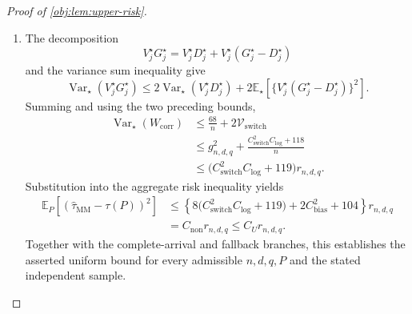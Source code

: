 \begin{proof}[Proof of \cref{obj:lem:upper-risk}]
\begin{enumerate}
To convert the first term into the benchmark, define
\[
\Lambda_n=\frac{e^{\ell_n/8}\ell_n^3}{n}.
\]
Since \(\delta^2\le\delta\), \(\ell_n\le\ell_n^2\), and \(B=256\ell_n\),
\[
4\delta^2B^2+2\delta B
\le262656\,\delta\ell_n^2.
\]
Substitution of \(m=n/8\) gives the calibrated bound
\[
12d\,e^{\ell_n/8}
\frac{4\delta^2B^2+2\delta B}{m^2}
\le
C_{\mathrm{switch}}g_{n,d,q}\Lambda_n,
\qquad
C_{\mathrm{switch}}=12\cdot64\cdot262656.
\]
The sixth term of the exponential series yields
\[
\frac{(3\ell_n/4)^6}{720}\le e^{3\ell_n/4},
\qquad
\ell_n^6\le720(4/3)^6e^{3\ell_n/4}.
\]
Since \(e^{\ell_n}=e+n\le(e+1)n\),
\[
\Lambda_n^2
=\frac{e^{\ell_n/4}\ell_n^6}{n^2}
\le\frac{720(4/3)^6e^{\ell_n}}{n^2}
\le\frac{C_{\mathrm{log}}}{n}.
\]
Finally, the nonnegative square
\((g_{n,d,q}-C_{\mathrm{switch}}\Lambda_n)^2\) gives
\[
C_{\mathrm{switch}}g_{n,d,q}\Lambda_n
\le\frac{g_{n,d,q}^2}{2}
+\frac{C_{\mathrm{switch}}^2\Lambda_n^2}{2}
\le\frac{g_{n,d,q}^2}{2}
+\frac{C_{\mathrm{switch}}^2C_{\mathrm{log}}}{2n}.
\]
Consequently,
\[
\mathcal V_{\mathrm{switch}}
\le
\frac{g_{n,d,q}^2}{2}
+\frac{C_{\mathrm{switch}}^2C_{\mathrm{log}}/2+25}{n}.
\]

\item The decomposition
\[
V_j^\star G_j^\star
=V_j^\star D_j^\star
+V_j^\star(G_j^\star-D_j^\star)
\]
and the variance sum inequality give
\[
\operatorname{Var}_\star(V_j^\star G_j^\star)
\le
2\operatorname{Var}_\star(V_j^\star D_j^\star)
+2\mathbb E_\star[
\{V_j^\star(G_j^\star-D_j^\star)\}^2].
\]
Summing and using the two preceding bounds,
\[
\begin{aligned}
\operatorname{Var}_\star(W_{\mathrm{corr}})
&\le\frac{68}{n}+2\mathcal V_{\mathrm{switch}}\\
&\le
g_{n,d,q}^2+
\frac{C_{\mathrm{switch}}^2C_{\mathrm{log}}+118}{n}\\
&\le
\bigl(C_{\mathrm{switch}}^2C_{\mathrm{log}}+119\bigr)
r_{n,d,q}.
\end{aligned}
\]
Substitution into the aggregate risk inequality yields
\[
\begin{aligned}
\mathbb E_P[(\widehat\tau_{\mathrm{MM}}-\tau(P))^2]
&\le
\left\{
8\bigl(C_{\mathrm{switch}}^2C_{\mathrm{log}}+119\bigr)
+2C_{\mathrm{bias}}^2+104
\right\}r_{n,d,q}\\
&=C_{\mathrm{non}}r_{n,d,q}
\le C_Ur_{n,d,q}.
\end{aligned}
\]
Together with the complete-arrival and fallback branches, this establishes the asserted uniform bound for every admissible \(n,d,q,P\) and the stated independent sample.
\end{enumerate}
\end{proof}
